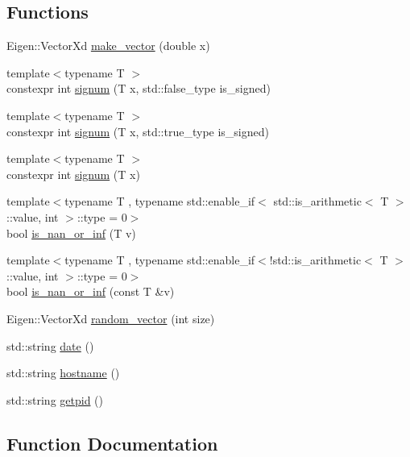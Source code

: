 \subsection*{Functions}
\begin{DoxyCompactItemize}
\item 
Eigen\+::\+Vector\+Xd \hyperlink{group__tools_ga029807776f0b7f44f806e4f9d92e34e7}{make\+\_\+vector} (double x)
\item 
{\footnotesize template$<$typename T $>$ }\\constexpr int \hyperlink{namespacelimbo_1_1tools_ac56ad2bccc403ffa8341394f2fc28cda}{signum} (T x, std\+::false\+\_\+type is\+\_\+signed)
\item 
{\footnotesize template$<$typename T $>$ }\\constexpr int \hyperlink{namespacelimbo_1_1tools_a5e6d3a39db3c143a271eac9625f9779e}{signum} (T x, std\+::true\+\_\+type is\+\_\+signed)
\item 
{\footnotesize template$<$typename T $>$ }\\constexpr int \hyperlink{group__tools_ga156cca8d927600da93054c952247857b}{signum} (T x)
\item 
{\footnotesize template$<$typename T , typename std\+::enable\+\_\+if$<$ std\+::is\+\_\+arithmetic$<$ T $>$\+::value, int $>$\+::type  = 0$>$ }\\bool \hyperlink{group__tools_gabcb0caa2ffabd42fa865c9ab0b624681}{is\+\_\+nan\+\_\+or\+\_\+inf} (T v)
\item 
{\footnotesize template$<$typename T , typename std\+::enable\+\_\+if$<$!std\+::is\+\_\+arithmetic$<$ T $>$\+::value, int $>$\+::type  = 0$>$ }\\bool \hyperlink{group__tools_gaf4ca69df04108670f0cc61e4a8ae7367}{is\+\_\+nan\+\_\+or\+\_\+inf} (const T \&v)
\item 
Eigen\+::\+Vector\+Xd \hyperlink{group__tools_ga2a64df3120a3ecd84e62640fb43722d0}{random\+\_\+vector} (int size)
\item 
std\+::string \hyperlink{group__tools_gafb48d3271e7423f8b8d94599869bd9cb}{date} ()
\item 
std\+::string \hyperlink{group__tools_ga4810ffa502d791d6ad750739a953f56f}{hostname} ()
\item 
std\+::string \hyperlink{group__tools_ga4ee13d198367d07cabd37316e671db09}{getpid} ()
\end{DoxyCompactItemize}


\subsection{Function Documentation}
\hypertarget{namespacelimbo_1_1tools_ac56ad2bccc403ffa8341394f2fc28cda}{}
